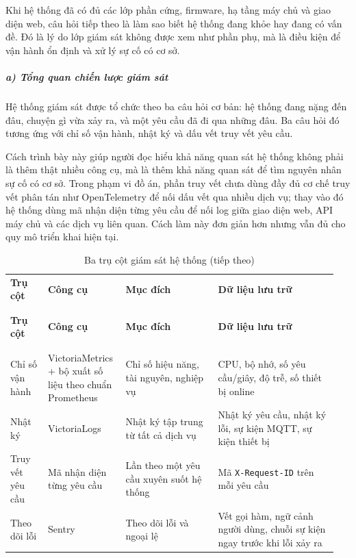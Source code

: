 \documentclass[a4paper]{extarticle}
\newcommand{\thesissettableid}[2]{%
  \renewcommand{\thetable}{#1}%
  \renewcommand{\theHtable}{#2}%
}
\begin{document}
Khi hệ thống đã có đủ các lớp phần cứng, firmware, hạ tầng máy chủ và
giao diện web,
câu hỏi tiếp theo là làm sao biết hệ thống đang khỏe hay đang có vấn đề.
Đó là lý do lớp giám sát không được xem như phần phụ, mà là điều kiện để
vận hành ổn định và xử lý sự cố có cơ sở.

\subparagraph{a) Tổng quan chiến lược giám
sát}\label{a-tux1ed5ng-quan-chiux1ebfn-lux1b0ux1ee3c-giuxe1m-suxe1t}

Hệ thống giám sát được tổ chức theo ba câu hỏi cơ bản: hệ thống đang
nặng đến đâu, chuyện gì vừa xảy ra, và một yêu cầu đã đi qua những đâu.
Ba câu hỏi đó tương ứng với chỉ số vận hành, nhật ký và dấu vết truy vết yêu cầu.

Cách trình bày này giúp người đọc hiểu khả năng quan sát hệ thống không
phải là thêm thật nhiều công cụ, mà là thêm khả năng quan sát để tìm
nguyên nhân sự cố có cơ sở. Trong phạm vi đồ án, phần truy vết chưa dùng
đầy đủ cơ chế truy vết phân tán như OpenTelemetry để nối dấu vết qua
nhiều dịch vụ; thay vào đó hệ thống dùng mã nhận diện từng yêu cầu để
nối log giữa giao diện web, API máy chủ và các dịch vụ liên quan.
Cách làm này đơn giản hơn nhưng vẫn đủ cho quy mô triển khai hiện tại.


{\thesissettableid{4.10}{tab-ch4-ba-tru-cot-giam-sat-he-thong}
\def\LTcaptype{table}
\begin{longtable}{|L{0.115\linewidth}|L{0.209\linewidth}|L{0.276\linewidth}|L{0.354\linewidth}|}
\caption{Ba trụ cột giám sát hệ thống}\label{tab:ch4-ba-tru-cot-giam-sat-he-thong}\\
\hline \textbf{Trụ cột} & \textbf{Công cụ} & \textbf{Mục đích} & \textbf{Dữ liệu lưu trữ} \\
\\\hline
\endfirsthead
\caption[]{Ba trụ cột giám sát hệ thống (tiếp theo)}\\
\hline \textbf{Trụ cột} & \textbf{Công cụ} & \textbf{Mục đích} & \textbf{Dữ liệu lưu trữ} \\
\\\hline
\endhead
\\\hline
\endfoot
\endlastfoot
Chỉ số vận hành & VictoriaMetrics + bộ xuất số liệu theo chuẩn Prometheus & Chỉ số
hiệu năng, tài nguyên, nghiệp vụ & CPU, bộ nhớ, số yêu cầu/giây, độ trễ,
số thiết bị online \\\hline
Nhật ký & VictoriaLogs & Nhật ký tập trung từ tất cả dịch vụ & Nhật ký
yêu cầu, nhật ký lỗi, sự kiện MQTT, sự kiện thiết bị \\\hline
Truy vết yêu cầu & Mã nhận diện từng yêu cầu & Lần theo một yêu cầu xuyên suốt hệ thống &
Mã \texttt{X-Request-ID} trên mỗi yêu cầu \\\hline
Theo dõi lỗi & Sentry & Theo dõi lỗi và ngoại lệ & Vết gọi hàm, ngữ cảnh người dùng,
chuỗi sự kiện ngay trước khi lỗi xảy ra \\\hline
\end{longtable}
}
\end{document}
